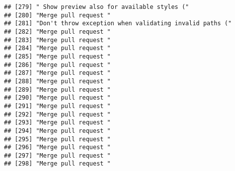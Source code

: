 \documentclass[
]{article}
\begin{document}
\begin{verbatim}
## [279] " Show preview also for available styles ("                                                                                  
## [280] "Merge pull request "                                                                                                        
## [281] "Don't throw exception when validating invalid paths ("                                                                      
## [282] "Merge pull request "                                                                                                        
## [283] "Merge pull request "                                                                                                        
## [284] "Merge pull request "                                                                                                        
## [285] "Merge pull request "                                                                                                        
## [286] "Merge pull request "                                                                                                        
## [287] "Merge pull request "                                                                                                        
## [288] "Merge pull request "                                                                                                        
## [289] "Merge pull request "                                                                                                        
## [290] "Merge pull request "                                                                                                        
## [291] "Merge pull request "                                                                                                        
## [292] "Merge pull request "                                                                                                        
## [293] "Merge pull request "                                                                                                        
## [294] "Merge pull request "                                                                                                        
## [295] "Merge pull request "                                                                                                        
## [296] "Merge pull request "                                                                                                        
## [297] "Merge pull request "                                                                                                        
## [298] "Merge pull request "                                                                                                        

\end{verbatim}
\end{document}
